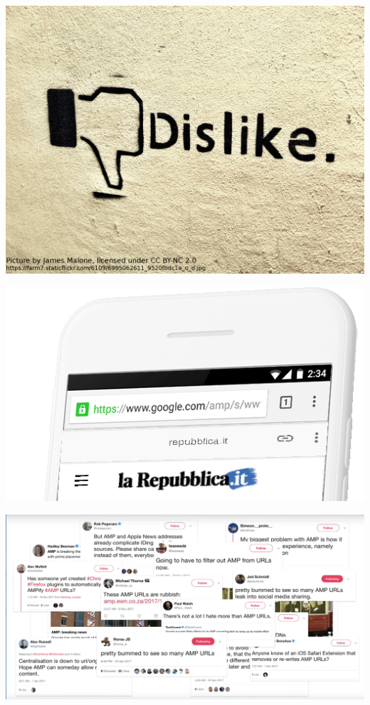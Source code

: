 \documentclass[graphic, aspectratio=169]{beamer}
\begin{document}
{\includegraphics[width=\paperwidth,height=\paperheight]{slides/images/dislike.jpg}}
\begin{frame}
\end{frame}

{\includegraphics[width=\paperwidth]{slides/images/repubblica_phone.png}}
\begin{frame}
\end{frame}

{\includegraphics[width=\paperwidth,height=\paperheight]{slides/images/against_amp.png}}
\begin{frame}
\end{frame}
\end{document}
